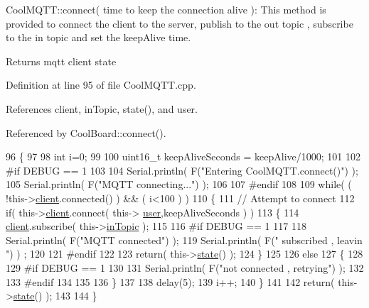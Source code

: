 Cool\+M\+Q\+T\+T\+::connect( time to keep the connection alive )\+: This method is provided to connect the client to the server, publish to the out topic , subscribe to the in topic and set the keep\+Alive time.

\begin{DoxyReturn}{Returns}
mqtt client state 
\end{DoxyReturn}


Definition at line 95 of file Cool\+M\+Q\+T\+T.\+cpp.



References client, in\+Topic, state(), and user.



Referenced by Cool\+Board\+::connect().


\begin{DoxyCode}
96 \{       
97 
98     \textcolor{keywordtype}{int} i=0;
99 
100     uint16\_t keepAliveSeconds = keepAlive/1000;
101 
102 \textcolor{preprocessor}{#if DEBUG == 1 }
103 
104     Serial.println( F(\textcolor{stringliteral}{"Entering CoolMQTT.connect()"}) );
105     Serial.println( F(\textcolor{stringliteral}{"MQTT connecting..."}) );
106 
107 \textcolor{preprocessor}{#endif}
108     
109     \textcolor{keywordflow}{while}( ( !this->\hyperlink{classCoolMQTT_a4ca71e4f76ef868692a297efd45b1415}{client}.connected() ) && ( i<100 ) ) 
110     \{
111         \textcolor{comment}{// Attempt to connect}
112         \textcolor{keywordflow}{if}( this->\hyperlink{classCoolMQTT_a4ca71e4f76ef868692a297efd45b1415}{client}.connect( this-> \hyperlink{classCoolMQTT_a8cd47e45d457f908d4b4390b35aaee83}{user},keepAliveSeconds  ) )
113         \{
114             \hyperlink{classCoolMQTT_a4ca71e4f76ef868692a297efd45b1415}{client}.subscribe( this->\hyperlink{classCoolMQTT_a4492f52a441e83cc5151010317fdb52d}{inTopic} );
115 
116 \textcolor{preprocessor}{        #if DEBUG == 1 }
117 
118             Serial.println( F(\textcolor{stringliteral}{"MQTT connected"}) );
119             Serial.println( F(\textcolor{stringliteral}{" subscribed , leavin "}) ) ;
120         
121 \textcolor{preprocessor}{        #endif}
122 
123             \textcolor{keywordflow}{return}( this->\hyperlink{classCoolMQTT_a5d003307eff78efbd585e42b43b72b6d}{state}() );
124         \}
125 
126         \textcolor{keywordflow}{else}
127         \{
128         
129 \textcolor{preprocessor}{        #if DEBUG == 1 }
130 
131             Serial.println( F(\textcolor{stringliteral}{"not connected , retrying"}) );
132         
133 \textcolor{preprocessor}{        #endif}
134 
135             
136         \}
137 
138     delay(5);
139     i++;
140     \}
141     
142     \textcolor{keywordflow}{return}( this->\hyperlink{classCoolMQTT_a5d003307eff78efbd585e42b43b72b6d}{state}() );
143 
144 \}
\end{DoxyCode}

